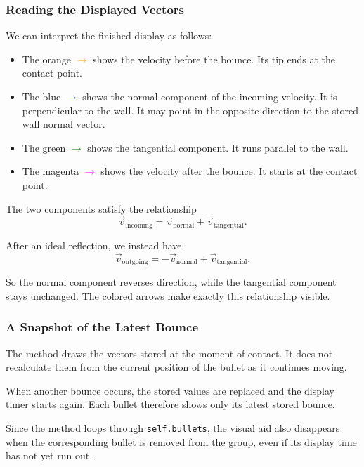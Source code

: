 \subsubsection*{Reading the Displayed Vectors}

We can interpret the finished display as follows:

\begin{itemize}
	\item The orange \textcolor{orange}{$\rightarrow$}  shows the velocity before the bounce. Its tip ends at the contact point.
	
	\item The blue \textcolor{blue}{$\rightarrow$}  shows the normal component of the incoming velocity. It is perpendicular to the wall. It may point in the opposite direction to the stored wall normal vector.
	
	\item The green \textcolor{green}{$\rightarrow$}  shows the tangential component. It runs parallel to the wall.
	
	\item The magenta \textcolor{magenta}{$\rightarrow$}  shows the velocity after the bounce. It starts at the contact point.
\end{itemize}

The two components satisfy the relationship
\[
\vec v_{\mathrm{incoming}}
=
\vec v_{\mathrm{normal}}
+
\vec v_{\mathrm{tangential}}.
\]

After an ideal reflection, we instead have
\[
\vec v_{\mathrm{outgoing}}
=
-\vec v_{\mathrm{normal}}
+
\vec v_{\mathrm{tangential}}.
\]

So the normal component reverses direction, while the tangential component stays unchanged. The colored arrows make exactly this relationship visible.

\subsubsection*{A Snapshot of the Latest Bounce}

The method draws the vectors stored at the moment of contact. It does not recalculate them from the current position of the bullet as it continues moving.

When another bounce occurs, the stored values are replaced and the display timer starts again. Each bullet therefore shows only its latest stored bounce.

Since the method loops through \texttt{self.bullets}, the visual aid also disappears when the corresponding bullet is removed from the group, even if its display time has not yet run out.

